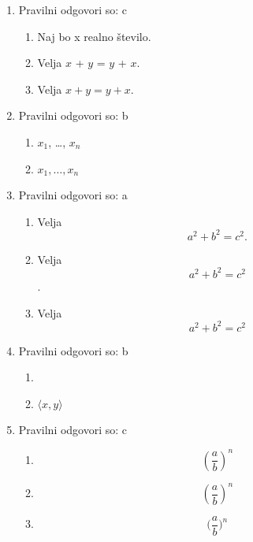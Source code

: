 \documentclass[11pt]{article}
\begin{document}
\begin{enumerate}
    \item Pravilni odgovori so: c %
    \begin{enumerate}
        \item Naj bo x realno število.
        \item Velja \(x\) + \(y\) = \(y\) + \(x\).
        \item Velja \(x + y = y + x\).
    \end{enumerate}

    \item Pravilni odgovori so: b %
    \begin{enumerate}
        \item \(x_1\), \dots, \(x_n\)
        \item \(x_1, \ldots, x_n\)
    \end{enumerate}

    \item Pravilni odgovori so: a %
    \begin{enumerate}
        \item
Velja
\[
  a^2 + b^2 = c^2.
\]
        \item
Velja
\[
  a^2 + b^2 = c^2
\]
.
        \item
Velja
\[
  a^2 + b^2 = c^2
\]
    \end{enumerate}

    \item Pravilni odgovori so: b %
    \begin{enumerate}
        \item \(<x, y>\)
        \item \(\langle x, y \rangle\)
    \end{enumerate}

    \item Pravilni odgovori so: c %
    \begin{enumerate}
        \item \[ (\frac{a}{b})^n \]
        \item \[ \left(\frac{a}{b}\right)^n \]
        \item \[ \Big(\frac{a}{b}\Big)^n \]
    \end{enumerate}


\end{enumerate}
\end{document}
